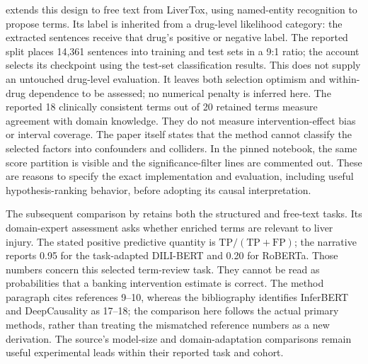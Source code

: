 \citet{rel66deepcausality} extends this design to free text from LiverTox,
using named-entity recognition to propose terms. Its label is inherited from a
drug-level likelihood category: the extracted sentences receive that drug's
positive or negative label. The reported split places 14,361 sentences into
training and test sets in a 9:1 ratio; the account selects its checkpoint using
the test-set classification results. This does not supply an untouched
drug-level evaluation. It leaves both selection optimism and within-drug
dependence to be assessed; no numerical penalty is inferred here. The reported
18 clinically consistent terms out of 20 retained terms measure agreement with
domain knowledge. They do not measure intervention-effect bias or interval
coverage. The paper itself states that the method cannot classify the selected
factors into confounders and colliders. In the pinned notebook, the same score
partition is visible and the significance-filter lines are commented out.
These are reasons to specify the exact implementation and evaluation,
including useful hypothesis-ranking behavior, before adopting its causal
interpretation. \citep{rel66deepcausalitycode}

The subsequent comparison by \citet{rel66pharma} retains both the structured
and free-text tasks. Its domain-expert assessment asks whether enriched terms
are relevant to liver injury. The stated positive predictive quantity is
$\mathrm{TP}/(\mathrm{TP}+\mathrm{FP})$; the narrative reports 0.95 for the
task-adapted DILI-BERT and 0.20 for RoBERTa. Those numbers concern this selected
term-review task. They cannot be read as probabilities that a banking
intervention estimate is correct. The method paragraph cites references 9--10,
whereas the bibliography identifies InferBERT and DeepCausality as 17--18;
the comparison here follows the actual primary methods, rather than treating
the mismatched reference numbers as a new derivation. The source's model-size
and domain-adaptation comparisons remain useful experimental leads within
their reported task and cohort.


